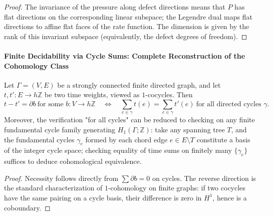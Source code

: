 \begin{proof}
The invariance of the pressure along defect directions means that \(P\) has flat directions on the corresponding linear subspace; the Legendre dual maps flat directions to affine flat faces of the rate function.
The dimension is given by the rank of this invariant subspace (equivalently, the defect degrees of freedom).
\end{proof}

\paragraph{Finite Decidability via Cycle Sums: Complete Reconstruction of the Cohomology Class}

\begin{proposition}\label{prop:xi-cycle-sums-determine-time-cohomology}
Let \(\Gamma=(V,E)\) be a strongly connected finite directed graph, and let \(t,t':E\to h\mathbb Z\) be two time weights, viewed as \(1\)-cocycles.
Then
\[
t-t'=\partial b\ \text{for some }b:V\to h\mathbb Z
\quad\Longleftrightarrow\quad
\sum_{e\in\gamma}t(e)=\sum_{e\in\gamma}t'(e)\ \text{for all directed cycles }\gamma.
\]
Moreover, the verification "for all cycles" can be reduced to checking on any finite fundamental cycle family generating \(H_1(\Gamma;\mathbb Z)\): take any spanning tree \(T\), and the fundamental cycles \(\gamma_e\) formed by each chord edge \(e\in E\setminus T\) constitute a basis of the integer cycle space; checking equality of time sums on finitely many \(\{\gamma_e\}\) suffices to deduce cohomological equivalence.
\end{proposition}

\begin{proof}
Necessity follows directly from \(\sum\partial b=0\) on cycles.
The reverse direction is the standard characterization of \(1\)-cohomology on finite graphs: if two cocycles have the same pairing on a cycle basis, their difference is zero in \(H^1\), hence is a coboundary.
\end{proof}


